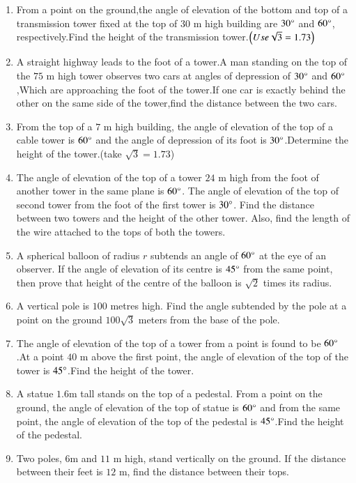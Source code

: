 \begin{enumerate}
\hfill{}\item  From a point on the ground,the angle of elevation of the bottom and top of a transmission tower fixed at the top of $30$ m high building are $30\degree$ and $60\degree$, respectively.Find the height of the transmission tower.$\left(Use \sqrt{3} = 1.73\right)$
 \hfill{}   

\item A straight highway leads to the foot of a tower.A man standing on the top of the $75$ m high tower observes two cars at angles of depression of $30\degree$ and $60\degree$,Which are approaching the foot of the tower.If one car is exactly behind the other on the same side of the tower,find the distance between the two cars.
    \hfill{}\item From the top of a $7$ m high building, the angle of elevation of the top of a cable tower is $60\degree$ and the angle of depression of its foot is $30\degree$.Determine the height of the tower.(take $\sqrt{3}=1.73$)
\hfill{}\item The angle of elevation of the top of a tower $24$ m high from the foot of another tower in the same plane is ${60}{\degree}$. The angle of elevation of the top of second tower from the foot of the first tower is ${30}{\degree}$. Find the distance between two towers and the height of the other tower. Also, find the length of the wire attached to the tops of both the towers.
\hfill{}\item A spherical balloon of radius $r$ subtends an angle of ${60}{\degree}$ at the eye of an observer. If the angle of elevation of its centre is ${45}{\degree}$ from the same point, then prove that height of the centre of the balloon is $\sqrt{2}$ times its radius.
    \hfill{}

\item A vertical pole is $100$ metres high. Find the angle subtended by the pole at a point on
the ground $100 \sqrt{3}$ meters from the base of the pole.

    \hfill{}\item The angle of elevation of the top of a tower from a point is found to be $60\degree$.At a point $40$ m above the first point, the angle of elevation of the top of the tower is $45\degree$.Find the height of the tower.
    \hfill{}\item A statue $1.6$m tall stands on the top of a pedestal. From a point on the ground, the angle of elevation of the top of statue is $60\degree$ and from the same point, the angle of elevation of the top of the pedestal is $45\degree$.Find the height of the pedestal.
    \hfill{}\item Two poles, $6$m and $11$ m high, stand vertically on the ground. If the distance between their feet is $12$ m, find the distance between their tops.


\end{enumerate}
